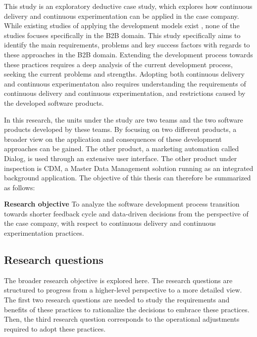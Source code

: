 \documentclass[english]{tktltiki2}
\theoremstyle{definition}
\theoremstyle{remark}
\begin{document}
This study is an exploratory deductive case study, which explores how continuous delivery and continuous experimentation can be applied in the case company. While existing studies of applying the development models exist \cite{neely2013continuous, bosch2012building, fagerholm2014building}, none of the studies focuses specifically in the B2B domain. This study specifically aims to identify the main requirements, problems and key success factors with regards to these approaches in the B2B domain. Extending the development process towards these practices requires a deep analysis of the current development process, seeking the current problems and strengths. Adopting both continuous delivery and continuous experimentaton also requires understanding the requirements of continuous delivery and continuous experimentation, and restrictions caused by the developed software products. 

In this research, the units under the study are two teams and the two software products developed by these teams. By focusing on two different products, a broader view on the application and consequences of these development approaches can be gained. The other product, a marketing automation called Dialog, is used through an extensive user interface. The other product under inspection is CDM, a Master Data Management \cite{loshin2010master} solution running as an integrated background application. The objective of this thesis can therefore be summarized as follows:

\bigskip
\noindent \textbf{Research objective}
To analyze the software development process transition towards shorter feedback cycle and data-driven decisions from the perspective of the case company, with respect to continuous delivery and continuous experimentation practices.

\subsection{Research questions}

The broader research objective is explored here. The research questions are structured to progress from a higher-level perspective to a more detailed view. The first two research questions are needed to study the requirements and benefits of these practices to rationalize the decisions to embrace these practices. Then, the third research question corresponds to the operational adjustments required to adopt these practices. \newline
\end{document}
